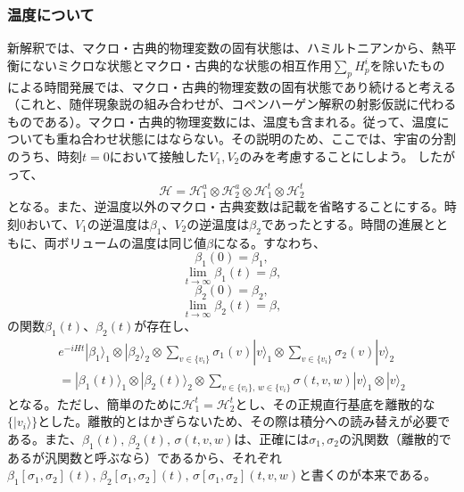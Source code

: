 \subsubsection{温度について}
新解釈では、マクロ・古典的物理変数の固有状態は、ハミルトニアンから、熱平衡にないミクロな状態とマクロ・古典的な状態の相互作用$\sum_pH_p^i$を除いたものによる時間発展では、マクロ・古典的物理変数の固有状態であり続けると考える（これと、随伴現象説の組み合わせが、コペンハーゲン解釈の射影仮説に代わるものである）。マクロ・古典的物理変数には、温度も含まれる。従って、温度についても重ね合わせ状態にはならない。その説明のため、ここでは、宇宙の分割のうち、時刻$t=0$において接触した${V_1,V_2}$のみを考慮することにしよう。 したがって、
\begin{equation}
    \mathcal{H} = \mathcal{H}_1^a \otimes \mathcal{H}_2^a \otimes \mathcal{H}_1^t \otimes \mathcal{H}_2^t 
\end{equation}
となる。また、逆温度以外のマクロ・古典変数は記載を省略することにする。時刻$0$おいて、$V_1$の逆温度は$\beta_1$、$V_2$の逆温度は$\beta_2$であったとする。時間の進展とともに、両ボリュームの温度は同じ値$\beta$になる。すなわち、
\begin{equation}
    \beta_1(0) = \beta_1,
\end{equation}
\begin{equation}
    \lim_{t \to \infty} \beta_1(t) = \beta,
\end{equation}
\begin{equation}
    \beta_2(0) = \beta_2,
\end{equation}
\begin{equation}
    \lim_{t \to \infty} \beta_2(t) = \beta,
\end{equation}
の関数$\beta_1(t)$、$\beta_2(t)$が存在し、
\begin{equation}
\begin{aligned}
    e^{-iHt}|\beta_1 \rangle_1 \otimes |\beta_2 \rangle_2 \otimes \sum_{v \in \{v_i\}} \sigma_1(v) |v\rangle_1 \otimes \sum_{v \in \{v_i\}}  \sigma_2(v) |v\rangle_2\\
    =  |\beta_1(t) \rangle_1 \otimes |\beta_2(t)\rangle_2 \otimes   \sum_{v \in \{v_i\} ,\, w \in \{v_i\}} \sigma(t,v,w)|v\rangle_1 \otimes |v\rangle_2
\end{aligned}
\end{equation}
となる。ただし、簡単のために$\mathcal{H}_1^t = \mathcal{H}_2^t$とし、その正規直行基底を離散的な$\{|v_i\rangle\}$とした。離散的とはかぎらないため、その際は積分への読み替えが必要である。また、$\beta_1(t),\,\beta_2(t),\,\sigma(t,v,w)$は、正確には$\sigma_1,\sigma_2$の汎関数（離散的であるが汎関数と呼ぶなら）であるから、それぞれ$\beta_1[\sigma_1,\sigma_2](t),\,\beta_2[\sigma_1,\sigma_2](t),\,\sigma[\sigma_1,\sigma_2](t,v,w)$と書くのが本来である。\\